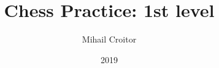 \documentclass[a5paper]{book}
\title{Chess Practice: 1st level}
\author{Mihail Croitor}
\date{2019}
\begin{document}
\maketitle


\pagebreak


\smallbreak

\smallbreak

\smallbreak

\smallbreak

\smallbreak

\smallbreak

\smallbreak

\smallbreak


\pagebreak


\smallbreak

\smallbreak

\smallbreak

\smallbreak

\smallbreak


\pagebreak


\smallbreak

\smallbreak

\smallbreak

\smallbreak

\smallbreak

\smallbreak


\pagebreak


\smallbreak

\smallbreak

\smallbreak


\pagebreak
{}
\fancyhead[RE,LO]{--}

\renewcommand{\labelenumi}{\bf{D.\arabic{enumi}}}
\begin{multicols}{2}



















\end{multicols}
\smallbreak
\begin{multicols}{2}




\end{multicols}
\end{document}
